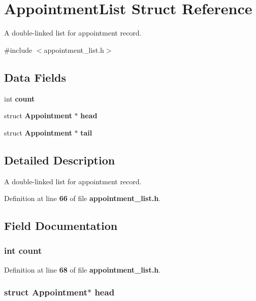 \section{Appointment\+List Struct Reference}
\label{struct_appointment_list}


A double-\/linked list for appointment record.  




{\ttfamily \#include $<$appointment\+\_\+list.\+h$>$}

\subsection*{Data Fields}
\begin{DoxyCompactItemize}
\item 
int {\bf count}
\item 
struct {\bf Appointment} $\ast$ {\bf head}
\item 
struct {\bf Appointment} $\ast$ {\bf tail}
\end{DoxyCompactItemize}


\subsection{Detailed Description}
A double-\/linked list for appointment record. 

Definition at line {\bf 66} of file {\bf appointment\+\_\+list.\+h}.



\subsection{Field Documentation}
\subsubsection[{count}]{\setlength{\rightskip}{0pt plus 5cm}int count}\label{struct_appointment_list_ad43c3812e6d13e0518d9f8b8f463ffcf}


Definition at line {\bf 68} of file {\bf appointment\+\_\+list.\+h}.

\subsubsection[{head}]{\setlength{\rightskip}{0pt plus 5cm}struct {\bf Appointment}$\ast$ head}\label{struct_appointment_list_a2722090ada7089d61838886e5b9b3892}


